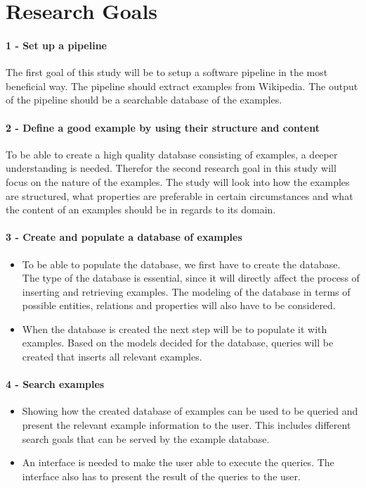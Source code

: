\section{Research Goals}


\paragraph{1 - Set up a pipeline}
The first goal of this study will be to setup a software pipeline in the most beneficial way. The pipeline should extract examples from Wikipedia. The output of the pipeline should be a searchable database of the examples.

\paragraph{2 - Define a good example by using their structure and content}
To be able to create a high quality database consisting of examples, a deeper understanding is needed. Therefor the second research goal in this study will focus on the nature of the examples. The study will look into how the examples are structured, what properties are preferable in certain circumstances and what the content of an examples should be in regards to its domain. 

\paragraph{3 - Create and populate a database of examples}
\begin{itemize}
    \item To be able to populate the database, we first have to create the database. The type of the database is essential, since it will directly affect the process of inserting and retrieving examples. The modeling of the database in terms of possible entities, relations and properties will also have to be considered.
    \item When the database is created the next step will be to populate it with examples. Based on the models decided for the database, queries will be created that inserts all relevant examples.
\end{itemize}


\paragraph{4 - Search examples }
\begin{itemize}
    \item Showing how the created database of examples can be used to be queried and present the relevant example information to the user. This includes different search goals that can be served by the example database.
    \item An interface is needed to make the user able to execute the queries. The interface also has to present the result of the queries to the user.
\end{itemize}


